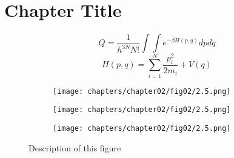%
%
\chapter{Chapter Title}
\label{chap:02}
\setlength{\parskip}{1em}
%
\lipsum[3]
%
\begin{equation}
    Q = \frac{1}{h^{3N}N!}\int\int{e^{-{\beta}H(p,q)}}dpdq
\end{equation}
%
\begin{equation}
    H(p,q) = \sum_{i=1}^{N}\frac{p_i^2}{2m_i}+V(q)
    \label{hamiltonian}
\end{equation}
%
%
\lipsum[4]
%
%
\begin{figure}[H]
{
\centering  
\begin{subfigure}{0.3 \textwidth}
    \centering
    {\texttt{[image: chapters/chapter02/fig02/2.5.png]}
    \caption{}\label{Fig.2.1.a}}
\end{subfigure}
%
\begin{subfigure}{0.3 \textwidth}
    \centering
    {\texttt{[image: chapters/chapter02/fig02/2.5.png]}
    \caption{}\label{Fig.2.1.b}}
\end{subfigure}
%
\begin{subfigure}{0.3 \textwidth}
    \centering
    {\texttt{[image: chapters/chapter02/fig02/2.5.png]}
    \caption{}\label{Fig.2.1.c}}
\end{subfigure}

\caption{Description of this figure}
\label{Fig.2.1}
}
\end{figure}
%
